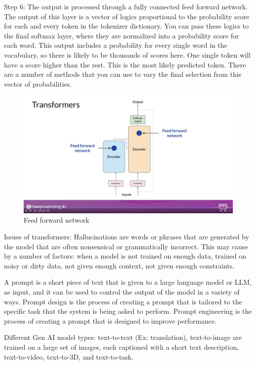 \documentclass[12pt]{report}
\begin{document}
Step 6: The output is processed through a fully connected feed forward network. The output of this layer is a vector of logics proportional to the probability score for each and every token in the tokenizer dictionary. You can pass these logics to the final softmax layer, where  they are normalized into a probability score for each word. This output includes a probability for every single word in the vocabulary, so there is likely to be thousands of scores here. One single token will have a score higher than the rest. This is the most likely predicted token. There are a number of methods that you can use to vary the final selection from this vector of probabilities.


\begin{figure}[H]
  \centering
  \caption{Feed forward network}
  \includegraphics[scale=0.2]{pics/feed.png}
\end{figure}



Issues of transformers: Hallucinations are words or phrases that are generated by the model that are often nonsensical or grammatically incorrect. This may cause by a number of factors: when a model is not trained on enough data, trained on noisy or dirty data, not given enough context, not given enough constraints.


A prompt is a short piece of text that is given to a large language model or LLM, as input, and it can be used to control the output of the model in a variety of ways. Prompt design is the process of creating a prompt that is tailored to the specific task that the system is being asked to perform. Prompt engineering is the process of creating a prompt that is designed to improve performance.


Different Gen AI model types: text-to-text (Ex: translation), text-to-image are trained on a large set of images, each captioned with a short text description, text-to-video, text-to-3D, and text-to-task.
\end{document}
